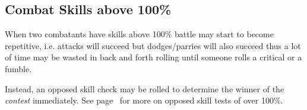 



\subsection{Combat Skills above 100\%}
When two combatants have skills above 100\% battle may start to become repetitive, i.e. attacks will succeed but dodges/parries will also succeed thus a lot of time may be wasted in back and forth rolling until someone rolls a critical or a fumble.

Instead, an opposed skill check may be rolled to determine the winner of the \emph{contest} immediately. See page~\pageref{ssec:opposed-tests-over-100} for more on opposed skill tests of over 100\%.








